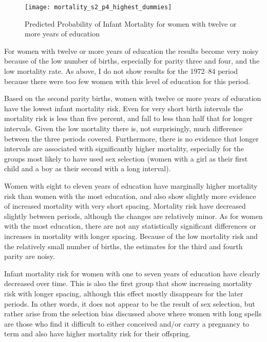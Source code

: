 \documentclass[12pt,letterpaper]{article}
\begin{document}
\begin{figure}[htpb]
{\begin{minipage}{0.29\textwidth}
        \texttt{[image: mortality\_s2\_p4\_highest\_dummies]}
    \end{minipage}
} 
\caption{Predicted Probability of Infant Mortality for women with twelve or
more years of education}
\label{fig:mortality_highest}
\end{figure}


For women with twelve or more years of education the results become very noisy
because of the low number of births, especially for parity three and four, and
the low mortality rate.
As above, I do not show results for the 1972--84 period because there were too
few women with this level of education for this period.

Based on the second parity births, women with twelve or more years of education
have the lowest infant mortality risk. 
Even for very short birth intervals the mortality risk is less than five percent,
and fall to less than half that for longer intervals.
Given the low mortality there is, not surprisingly, much difference between
the three periods covered.
Furthermore, there is no evidence that longer intervals are associated with
significantly higher mortality, especially for the groups most likely to have
used sex selection (women with a girl as their first child and a boy as their
second with a long interval).

Women with eight to eleven years of education have marginally higher mortality
risk than women with the most education, and also show slightly more evidence
of increased mortality with very short spacing.
Mortality risk have decreased slightly between periods, although the changes
are relatively minor.
As for women with the most education, there are not any statistically significant 
differences or increases in mortality with longer spacing.
Because of the low mortality risk and the relatively small number of births,
the estimates for the third and fourth parity are noisy.

Infant mortality risk for women with one to seven years of education have
clearly decreased over time.
This is also the first group that show increasing mortality risk with longer
spacing, although this effect mostly disappears for the later periods.
In other words, it does not appear to be the result of sex selection, but
rather arise from the selection bias discussed above where women with long
spells are those who find it difficult to either conceived and/or carry a 
pregnancy to term and also have higher mortality risk for their offspring.
\end{document}
